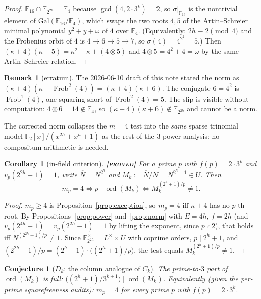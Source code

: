 \documentclass[11pt]{article}
\theoremstyle{plain}
\newtheorem{corollary}{Corollary}
\newtheorem{conjecture}{Conjecture}
\theoremstyle{definition}
\newtheorem{remark}{Remark}
\newcommand{\F}{\mathbb{F}}
\newcommand{\ord}{\operatorname{ord}}
\newcommand{\Frob}{\operatorname{Frob}}
\newcommand{\nimmul}{\otimes}
\newcommand{\PROVED}{\textbf{[\textsc{proved}]}}
\begin{document}
\begin{proof}
$\F_{16}\cap\F_{2^{2h}}=\F_4$ because $\gcd(4,2\cdot3^k)=2$, so
$\sigma|_{\F_{16}}$ is the nontrivial element of
$\mathrm{Gal}(\F_{16}/\F_4)$, which swaps the two roots $4,5$ of the
Artin--Schreier minimal polynomial $y^2+y+\omega$ of $4$ over $\F_4$.
(Equivalently: $2h\equiv2\pmod4$ and the Frobenius orbit of $4$ is
$4\to6\to5\to7$, so $\sigma(4)=4^{2^2}=5$.) Then
$(\kappa+4)(\kappa+5)=\kappa^2+\kappa+(4\nimmul5)$ and
$4\nimmul5=4^2+4=\omega$ by the same Artin--Schreier relation.
\end{proof}

\begin{remark}[erratum]\label{rem:erratum}
The 2026-06-10 draft of this note stated the norm as
$(\kappa+4)(\kappa+\Frob^2(4))=(\kappa+4)(\kappa+6)$. The conjugate
$6=4^2$ is $\Frob^1(4)$, one squaring short of $\Frob^2(4)=5$. The slip
is visible without computation: $4\nimmul6=14\notin\F_4$, so
$(\kappa+4)(\kappa+6)\notin\F_{2^{2h}}$ and cannot be a norm.
\end{remark}

The corrected norm collapses the $m=4$ test into the \emph{same} sparse
trinomial model $\F_2[x]/(x^{2h}+x^h+1)$ as the rest of the $3$-power
analysis: no compositum arithmetic is needed.

\begin{corollary}[in-field criterion]\label{cor:m4crit}
\PROVED{} For a prime $p$ with $f(p)=2\cdot3^k$ and $v_p(2^{2h}-1)=1$,
write $\overline{N}=N^{2^h}$ and $M_k:=\overline{N}/N=N^{2^h-1}\in U$.
Then
\[
  m_p=4
  \iff
  p\mid\ord(M_k)
  \iff
  M_k^{(2^h+1)/p}\neq1 .
\]
\end{corollary}

\begin{proof}
$m_p\geq4$ is Proposition~\ref{prop:exception}, so $m_p=4$ iff
$\kappa+4$ has no $p$-th root. By Propositions~\ref{prop:power}
and~\ref{prop:norm} with $E=4h$, $f=2h$ (and
$v_p(2^{4h}-1)=v_p(2^{2h}-1)=1$ by lifting the exponent, since
$p\nmid2$), that holds iff $N^{(2^{2h}-1)/p}\neq1$. Since
$\F_{2^{2h}}^{\times}=L^{\times}\times U$ with coprime orders,
$p\mid2^h+1$, and $(2^{2h}-1)/p=(2^h-1)\cdot\bigl((2^h+1)/p\bigr)$, the
test equals $M_k^{(2^h+1)/p}\neq1$.
\end{proof}

\begin{conjecture}[$D_k$: the column analogue of $C_k$]\label{conj:dk}
The prime-to-$3$ part of $\ord(M_k)$ is full:
$\bigl((2^h+1)/3^{k+1}\bigr)\mid\ord(M_k)$. Equivalently (given the
per-prime squarefreeness audits): $m_p=4$ for \emph{every} prime $p$
with $f(p)=2\cdot3^k$.
\end{conjecture}
\end{document}
